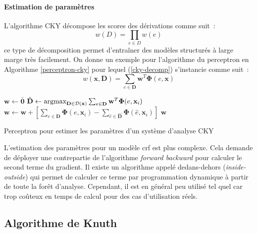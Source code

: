 \documentclass[11pt,openany]{book}
\begin{document}
\paragraph{Estimation de paramètres}
L'algorithme CKY décompose les scores des dérivations comme suit~:
\begin{equation}
\label{cky-decomp}
w(D) = \prod_{e\in D} w(e) 
\end{equation}
ce type de décomposition permet d'entraîner des modèles structurés à large marge très facilement.
On donne un exemple pour l'algorithme du perceptron en Algorithme \ref{perceptron-cky} 
pour lequel (\ref{cky-decomp}) s'instancie comme suit~:
\begin{displaymath}
w(\mathbf{x},\mathbf{D}) = \sum_{e\in \mathbf{D}} \mathbf{w}^T \boldsymbol\Phi(e,\mathbf{x}) 
\end{displaymath}

\begin{algorithm}[htbp]
\begin{algorithmic}[1]
\State $\mathbf{w} \gets \bar{\mathbf{0}}$
\State
$\hat{\mathbf{D}} \gets \mathop{\text{argmax}}_{\mathbf{D}\in
  \mathbf{\cal D}(\mathbf{x})} 
\sum_{e\in \mathbf{D}} \mathbf{w}^T \boldsymbol\Phi(e,\mathbf{x}_i)$
     \State $\mathbf{w} \gets  \mathbf{w} +
     \left[ \sum_{e\in \mathbf{D}} \boldsymbol\Phi(e,\mathbf{x}_i) 
       - \sum_{\hat{e} \in \hat{\mathbf{D}}} \boldsymbol\Phi(\hat{e},\mathbf{x}_i)   \right]$ 
\EndIf
\EndFor
\EndFor
\State \Return $\mathbf{w}$
\EndFunction
\end{algorithmic}
\caption{\label{perceptron-cky}Perceptron pour estimer les paramètres d'un système d'analyse
  CKY}
\end{algorithm}

L'estimation des paramètres pour un modèle {\sc crf} est plus complexe. 
Cela demande de déployer une contrepartie de l'algorithme
{\em forward backward} pour calculer le second terme du gradient. Il existe un algorithme appelé dedans-dehors
({\em inside-outside}) qui permet de calculer ce terme par programmation dynamique à partir de toute la forêt d'analyse. 
Cependant, il est en général peu utilisé tel quel car trop coûteux en temps de calcul pour des cas d'utilisation réels. 



\subsection{Algorithme de Knuth}
\end{document}
